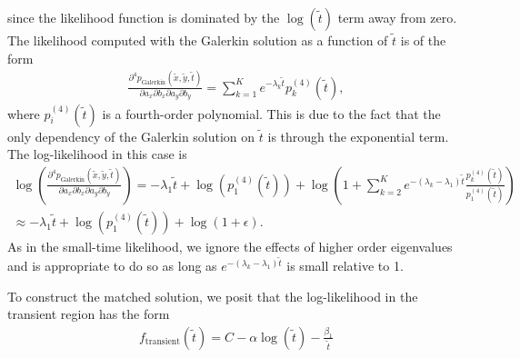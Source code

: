 since the likelihood function is dominated by the $\log(\tilde{t})$
term away from zero.  The likelihood computed with the Galerkin solution as a
function of $\tilde{t}$ is of the form
\begin{align*}
  \frac{\partial^4 p_{\mbox{Galerkin}}(\tilde{x}, \tilde{y}, \tilde{t})}{\partial a_x
  \partial b_x \partial a_y \partial b_y} = \sum_{k=1}^{K} e^{-\lambda_k\tilde{t}} p_k^{(4)}(\tilde{t}),
\end{align*}
where $p_i^{(4)}(\tilde{t})$ is a fourth-order polynomial. This is due
to the fact that the only dependency of the Galerkin solution on
$\tilde{t}$ is through the exponential term. The log-likelihood in
this case is
\begin{multline}
  \log\left(\frac{\partial^4 p_{\mbox{Galerkin}}(\tilde{x}, \tilde{y}, \tilde{t})}{\partial a_x
      \partial b_x \partial a_y \partial b_y}\right) = -\lambda_1\tilde{t} + \log(p_1^{(4)}(\tilde{t})) + \log\left( 1 + \sum_{k=2}^K e^{-(\lambda_k-\lambda_1)\tilde{t}}\frac{p_k^{(4)}(\tilde{t})}{p_1^{(4)}(\tilde{t})} \right) \\
  \approx -\lambda_1\tilde{t} + \log(p_1^{(4)}(\tilde{t})) + \log\left( 1 + \epsilon \right).
\end{multline}
As in the small-time likelihood, we ignore the effects of higher order
eigenvalues and is appropriate to do so as long as
$e^{-(\lambda_k-\lambda_1)\tilde{t}}$ is small relative to 1.

To construct the matched solution, we posit that the log-likelihood in
the transient region has the form
\begin{align}
  f_{\mbox{transient}}(\tilde{t}) = C - \alpha\log(\tilde{t}) - \frac{\beta_1}{\tilde{t}}
\end{align}
